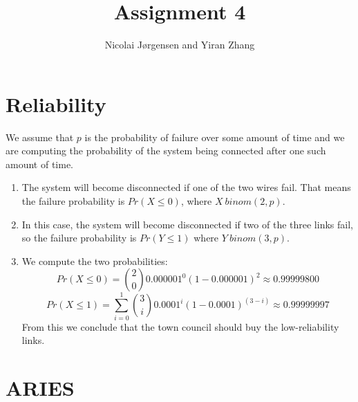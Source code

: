 \documentclass[11pt]{article}
\title          {Assignment 4}
\author         {Nicolai Jørgensen and Yiran Zhang}
\begin{document}
\maketitle
\newpage

\section{Reliability}

We assume that $p$ is the probability of failure over some amount of time and we
are computing the probability of the system being connected after one such
amount of time.

\begin{enumerate}
  \item
    The system will become disconnected if one of the two wires fail. That means
    the failure probability is $Pr(X \leq 0)$, where $X ~ binom(2,p)$.
  \item
    In this case, the system will become disconnected if two of the three links
    fail, so the failure probability is $Pr(Y \leq 1)$ where $Y ~ binom(3,p)$.
  \item
    We compute the two probabilities:
    $$ Pr(X \leq 0) = { 2 \choose 0 } 0.000001^0(1-0.000001)^2 \approx 0.99999800 $$
    $$ Pr(X \leq 1) = \sum_{i=0}^1 { 3 \choose i }0.0001^i(1-0.0001)^{(3-i)} \approx 0.99999997 $$
    From this we conclude that the town council should buy the low-reliability links.
\end{enumerate}

\section{ARIES}
\end{document}
